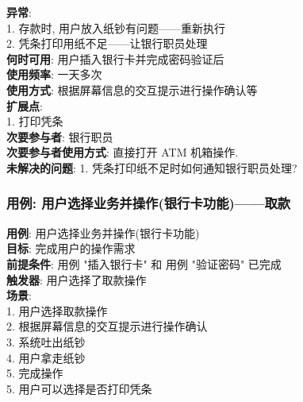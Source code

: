 \documentclass[UTF8]{article}
\begin{document}
\textbf{异常}: \\
	\hspace*{2em} 1. 存款时, 用户放入纸钞有问题——重新执行 \\
	\hspace*{2em} 2. 凭条打印用纸不足——让银行职员处理 \\
\textbf{何时可用}: 用户插入银行卡并完成密码验证后
\\
\textbf{使用频率}: 一天多次
\\
\textbf{使用方式}: 根据屏幕信息的交互提示进行操作确认等
\\
\textbf{扩展点}: \\
	\hspace*{2em}1. 打印凭条 \\
\textbf{次要参与者}: 银行职员
\\
\textbf{次要参与者使用方式}: 直接打开 ATM 机箱操作.
\\
\textbf{未解决的问题}: 
	\hspace*{2em} 1. 凭条打印纸不足时如何通知银行职员处理? \\
	
\subsubsection{用例: 用户选择业务并操作(银行卡功能)——取款}
\noindent
\textbf{用例}: 用户选择业务并操作(银行卡功能)
\\
\textbf{目标}: 完成用户的操作需求
\\
\textbf{前提条件}: 用例 "插入银行卡" 和 用例 "验证密码" 已完成
\\
\textbf{触发器}: 用户选择了取款操作
\\
\textbf{场景}: \\
	\hspace*{2em}1. 用户选择取款操作 \\
	\hspace*{2em}2. 根据屏幕信息的交互提示进行操作确认 \\
	\hspace*{2em}3. 系统吐出纸钞 \\
	\hspace*{2em}4. 用户拿走纸钞 \\
	\hspace*{2em}5. 完成操作 \\
	\hspace*{2em} 5. 用户可以选择是否打印凭条 \\
	
\end{document}
